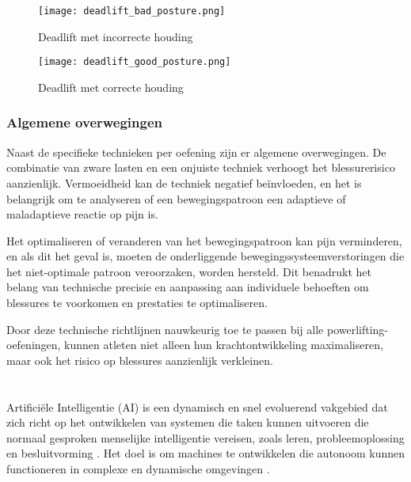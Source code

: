 \begin{figure}[h]
  \centering
  \begin{minipage}{0.45\textwidth}
      \centering
      \texttt{[image: deadlift\_bad\_posture.png]}
      \caption[Figuur 1]{\label{fig:deadlift_incorrect}Deadlift met incorrecte houding \autocite{BirdEtAl2010}}
  \end{minipage}
  \hfill %
  \begin{minipage}{0.45\textwidth}
      \centering
      \texttt{[image: deadlift\_good\_posture.png]}
      \caption[Figuur 2]{\label{fig:deadlift_correct}Deadlift met correcte houding \autocite{BirdEtAl2010}}
  \end{minipage}
\end{figure}   

\subsubsection{Algemene overwegingen}
Naast de specifieke technieken per oefening zijn er algemene overwegingen. De combinatie van zware lasten en een onjuiste techniek verhoogt het blessurerisico aanzienlijk. 
Vermoeidheid kan de techniek negatief beïnvloeden, en het is belangrijk om te analyseren of een bewegingspatroon een adaptieve of maladaptieve reactie op pijn is.

Het optimaliseren of veranderen van het bewegingspatroon kan pijn verminderen, en als dit het geval is, moeten de onderliggende bewegingssysteemverstoringen die het niet-optimale patroon veroorzaken, worden hersteld. 
Dit benadrukt het belang van technische precisie en aanpassing aan individuele behoeften om blessures te voorkomen en prestaties te optimaliseren\cite{tymchik2021}.

\medskip

Door deze technische richtlijnen nauwkeurig toe te passen bij alle powerlifting-oefeningen, kunnen atleten niet alleen hun krachtontwikkeling maximaliseren, maar ook het risico op blessures aanzienlijk verkleinen.

\section{}%
\label{sec:artificiële-intelligentie}

Artificiële Intelligentie (AI) is een dynamisch en snel evoluerend vakgebied dat zich richt op het ontwikkelen van systemen die taken kunnen uitvoeren die normaal gesproken menselijke intelligentie vereisen, zoals leren, probleemoplossing en besluitvorming \autocite{SharifaniEtAl2023}.
Het doel is om machines te ontwikkelen die autonoom kunnen functioneren in complexe en dynamische omgevingen \autocite{Kouassi2023}.

